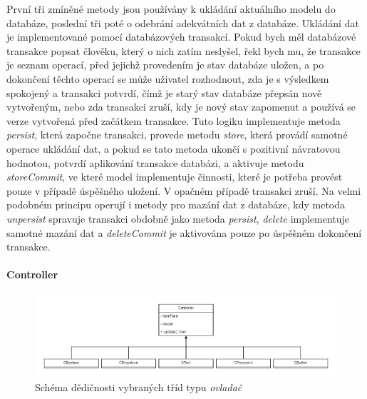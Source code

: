 První tři zmíněné metody jsou používány k ukládání aktuálního modelu do databáze, poslední tři poté o odebrání adekvátních dat z databáze.
Ukládání dat je implementované pomocí databázových transakcí. Pokud bych měl databázové transakce popsat člověku, který o nich zatím neslyšel, řekl bych mu, že transakce je seznam operací, před jejichž provedením je stav databáze uložen, a po dokončení těchto operací se může uživatel rozhodnout, zda je s výsledkem spokojený a transakci potvrdí, čímž je starý stav databáze přepsán nově vytvořeným, nebo zda transakci zruší, kdy je nový stav zapomenut a používá se verze vytvořená před začátkem transakce. Tuto logiku implementuje metoda \emph{persist}, která započne transakci, provede metodu \emph{store}, která provádí samotné operace ukládání dat, a pokud se tato metoda ukončí s pozitivní návratovou hodnotou, potvrdí aplikování transakce databázi, a aktivuje metodu \emph{storeCommit}, ve které model implementuje činnosti, které je potřeba provést pouze v případě úspěšného uložení. V opačném případě transakci zruší. Na velmi podobném principu operují i metody pro mazání dat z databáze, kdy metoda \emph{unpersist} spravuje transakci obdobně jako metoda \emph{persist}, \emph{delete} implementuje samotné mazání dat a \emph{deleteCommit} je aktivována pouze po úspěšném dokončení transakce.

\paragraph{Controller} \hfill

\begin{figure}[h!]
    \centering
    \includegraphics[width=1\textwidth]{images/controller-tridy.png}
    \caption{Schéma dědičnosti vybraných tříd typu \emph{ovladač}}
    \label{viewClasses}
\end{figure}

